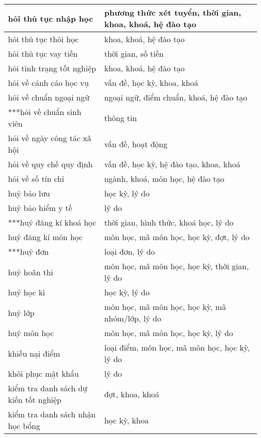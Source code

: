 \begin{table}[htbp]
\begin{tabular}{|l|l|}
        \hline
        hỏi thủ tục nhập học & phương thức xét tuyển, thời gian, khoa, khoá, hệ đào tạo \\
        \hline
        hỏi thủ tục thôi học & khoa, khoá, hệ đào tạo \\
        \hline
        hỏi thủ tục vay tiền & thời gian, số tiền \\
        \hline
        hỏi tình trạng tốt nghiệp & khoa, khoá, hệ đào tạo \\
        \hline
        hỏi về cảnh cáo học vụ & vấn đề, học kỳ, khoa, khoá \\
        \hline
        hỏi về chuẩn ngoại ngữ & ngoại ngữ, điểm chuẩn, khoá, hệ đào tạo \\
        \hline
        ***hỏi về chuẩn sinh viên & thông tin \\
        \hline
        hỏi về ngày công tác xã hội & vấn đề, hoạt động \\
        \hline
        hỏi về quy chế quy định & vấn đề, học kỳ, hệ đào tạo, khoa, khoá \\
        \hline
        hỏi về số tín chỉ & ngành, khoá, môn học, hệ đào tạo \\
        \hline
        huỷ bảo lưu & học kỳ, lý do \\
        \hline
        huỷ bảo hiểm y tế & lý do \\
        \hline
        ***huỷ đăng kí khoá học & thời gian, hình thức, khoá học, lý do \\
        \hline
        huỷ đăng kí môn học & môn học, mã môn học, học kỳ, đợt, lý do \\
        \hline
        ***huỷ đơn & loại đơn, lý do \\
        \hline
        huỷ hoãn thi & môn học, mã môn học, học kỳ, thời gian, lý do \\
        \hline
        huỷ học kì & học kỳ, lý do \\
        \hline
        huỷ lớp & môn học, mã môn học, học kỳ, mã nhóm/lớp, lý do \\
        \hline
        huỷ môn học & môn học, mã môn học, học kỳ, lý do \\
        \hline
        khiếu nại điểm & loại điểm, môn học, mã môn học, học kỳ, lý do \\
        \hline
        khôi phục mật khẩu & lý do \\
        \hline
        kiểm tra danh sách dự kiến tốt nghiệp & đợt, khoa, khoá \\
        \hline
        kiểm tra danh sách nhận học bổng & học kỳ, khoa \\

\end{tabular}
\end{table}
